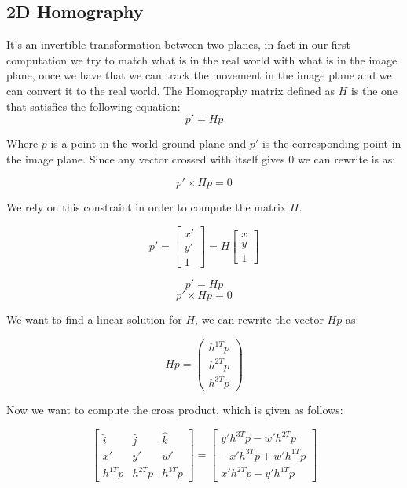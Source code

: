 \subsection{2D Homography}

It's an invertible transformation between two planes, in fact in our first computation we try to match what is in the real world with what is in the image plane, once we have that we can track the movement in the image plane and we can convert it to the real world. The Homography matrix defined as \(H\) is the one that satisfies the following equation:
\[
    p' = Hp    
\]

Where \(p\) is a point in the world ground plane and \(p'\) is the corresponding point in the image plane. Since any vector crossed with itself gives 0 we can rewrite is as:

\[
    p' \times Hp = 0    
\]

We rely on this constraint in order to compute the matrix \(H\).

\begin{multicols}{2}
    

\[
    p' =
    \begin{bmatrix}
        x' \\
        y' \\
        1
    \end{bmatrix}
    =
    H
    \begin{bmatrix}
        x \\
        y \\
        1
    \end{bmatrix}
\]

\[
    p'= Hp
\]
\[
    p' \times Hp = 0
\]
\end{multicols}

We want to find a linear solution for \(H\), we can rewrite the vector \(Hp\) as:

\[
    Hp = 
    \begin{pmatrix}
        h^{1T}p\\
        h^{2T}p\\
        h^{3T}p
    \end{pmatrix}
\]

Now we want to compute the cross product, which is given as follows:

\[
    \begin{bmatrix}
        \hat{i} & \hat{j} & \hat{k} \\
        x' & y' & w' \\
        h^{1T}p & h^{2T}p & h^{3T}p
    \end{bmatrix}    
    =
    \begin{bmatrix}
        y'h^{3T}p - w'h^{2T}p \\
        -x'h^{3T}p + w'h^{1T}p \\
        x'h^{2T}p - y'h^{1T}p
    \end{bmatrix}
\]

